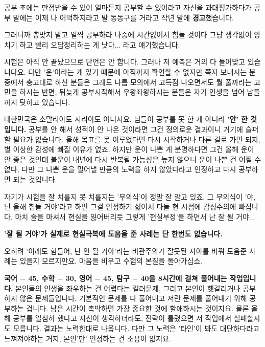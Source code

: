 공부 초에는 만점받을 수 있어 얼마든지 공부할 수 있어라고 자신을 과대평가하다가
공부 말에는 이제 나 어떡하지라고 발 동동구를 거라고 작년 말에 \textbf{경고}했습니다.
\vspace{5mm}

그러니까 뽕맞지 말고 일찍 공부하라 나중에 시간없어서 힘들 것이다
그냥 생각없이 양치기 하고 빨리 오답정리하는 게 낫다... 라고 얘기했습니다.
\vspace{5mm}

시험은 아직 안 끝났으므로 단언은 안 합니다. 그러나 저 예측은 거의 다 들어맞고 있습니다요.
다만 '운'이라는 게 있기 때문에 아직까지 확언할 수 없지만
쪽지 보내시는 분 중에서 충고대로 하신 분들은 그래도 나름 모의에서 고득점 나오면서도 뭘 풀까라는 고민을 하시는 반면,
뒤늦게 공부시작해서 우왕좌왕하시는 분들은 자기 인생을 넘어 남들까지 탓하고 있습니다.
\vspace{5mm}

대한민국은 소말리아도 시리아도 아니지요. 님들이 공부를 못 한 게 아니라 \textbf{'안' 한 것입니다.}
공부를 안 해서 성적이 안 나온 것이라면 그건 정의로운 결과이니 거기에 슬퍼할 필요가 없습니다.
올해 목표를 못 이루었다면 다시 시작하거나 다른 길로 가면 되지, 별 이상한 감성에 빠질 이유가 없죠.
하지만 운이 나쁜 게 분명하다면 그건 올해 운이 안 좋은 것인데 불운이 내년에 다시 반복될 가능성은 높지 않으니
운이 나쁜 건 어쩔 수 없다, 다만 그 나쁜 운을 밀어낼 만큼의 노력을 하지 않았다라고 인정하고 다시 공부하면 되는 것입니다.
\vspace{5mm}

자기가 시험을 잘 치를지 못 치를지는 '무의식'이 정말 잘 알고 있죠.
그 무의식이 '야, 넌 올해 힘들 거야'라고 하면 그걸 인정하기 싫어서 다들 현 시점에 감성주의에 빠집니다.
마치 술을 마셔서 현실을 잃어버리듯 그렇게 '현실부정'을 하면서 난 잘 될 거야...
\vspace{5mm}

\textbf{'잘 될 거야'가 실제로 현실극복에 도움울 준 사례는 단 한번도 없습니다.}
\vspace{5mm}

오히려 '이래도 힘들어, 난 안 될 거야'라는 비관주의가 잘못된 자아를 바꿔 도움준 사례는 있을지 모르지만요.
마음을 비우고 수험의 본질을 돌아가십쇼.
\vspace{5mm}

\textbf{국어 $-$ 45, 수학 $-$ 30, 영어 $-$ 45, 탐구 $-$ 40을 8시간에 걸쳐 풀어내는 작업입니다.}
본인들의 인생을 좌우하는 건 어렵다는 킬러문제, 그리고 본인이 헷갈리거나 공부하지 않은 문제들입니다.
기본적인 문제를 다 풀어내고 저런 문제를 풀어내기 위해 공부하는 겁니다. 남은 시간이 촉박하면 가장 중요한 것에 할애하시는 것이지요.
물론 올해 공부를 열심히 했다고 자신이 생각하더라도, 전략이 틀렸으면 저 작업에서 실패할지도 모릅니다.
결과는 노력한대로 나옵니다. 다만 그 노력은 '타인'이 봐도 대단하다라고 느껴져야하는 거지, 본인'만' 인정하는 건 소용이 없지요.
\vspace{5mm}

